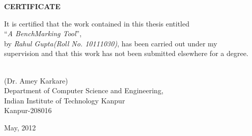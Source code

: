 \vspace*{1.0in}
\begin{center}
\begin{large}
{\bf CERTIFICATE}
\end{large}
\end{center}
\vskip 2cm
It is certified that the work contained in this thesis entitled \\``{{\textit{A BenchMarking Tool}}}'',\\ by {{\textit{Rahul Gupta(Roll No. 10111030)}}}, has been carried out under my \\supervision and that this work has not been submitted elsewhere for a degree.
\vskip 1in
\begin{flushleft}
		\hspace*{5.8cm}{\hrulefill}\\
		\hspace*{5.8cm}(Dr. Amey Karkare)\\
		\hspace*{5.8cm}Department of Computer Science and Engineering,\\ 
		\hspace*{5.8cm}Indian Institute of Technology Kanpur\\
		\hspace*{5.8cm}Kanpur-208016
\end{flushleft}
May, 2012

